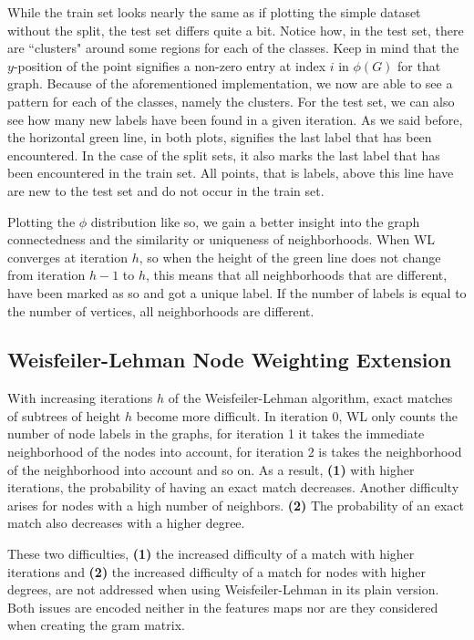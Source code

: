 While the train set looks nearly the same as if plotting the simple dataset without the split, the test set differs quite a bit.
Notice how, in the test set, there are ``clusters" around some regions for each of the classes. 
Keep in mind that the $y$-position of the point signifies a non-zero entry at index $i$ in $\phi(G)$ for that graph.
Because of the aforementioned implementation, we now are able to see a pattern for each of the classes, namely the clusters.
For the test set, we can also see how many new labels have been found in a given iteration.
As we said before, the horizontal green line, in both plots, signifies the last label that has been encountered.
In the case of the split sets, it also marks the last label that has been encountered in the train set.
All points, that is labels, above this line have are new to the test set and do not occur in the train set.

Plotting the $\phi$ distribution like so, we gain a better insight into the graph connectedness and the similarity or uniqueness of neighborhoods.
When WL converges at iteration $h$, so when the height of the green line does not change from iteration $h-1$ to $h$, this means that all neighborhoods that are different, have been marked as so and got a unique label.
If the number of labels is equal to the number of vertices, all neighborhoods are different.


\subsection{Weisfeiler-Lehman Node Weighting Extension}
With increasing iterations $h$ of the Weisfeiler-Lehman algorithm, exact matches of subtrees of height $h$ become more difficult.
In iteration 0, WL only counts the number of node labels in the graphs, for iteration 1 it takes the immediate neighborhood of the nodes into account, for iteration 2 is takes the neighborhood of the neighborhood into account and so on.
As a result, \textbf{(1)} with higher iterations, the probability of having an exact match decreases. Another difficulty arises for nodes with a high number of neighbors. \textbf{(2)} The probability of an exact match also decreases with a higher degree.

These two difficulties, \textbf{(1)} the increased difficulty of a match with higher iterations and \textbf{(2)} the increased difficulty of a match for nodes with higher degrees, are not addressed when using Weisfeiler-Lehman in its plain version. Both issues are encoded neither in the features maps nor are they considered when creating the gram matrix.

